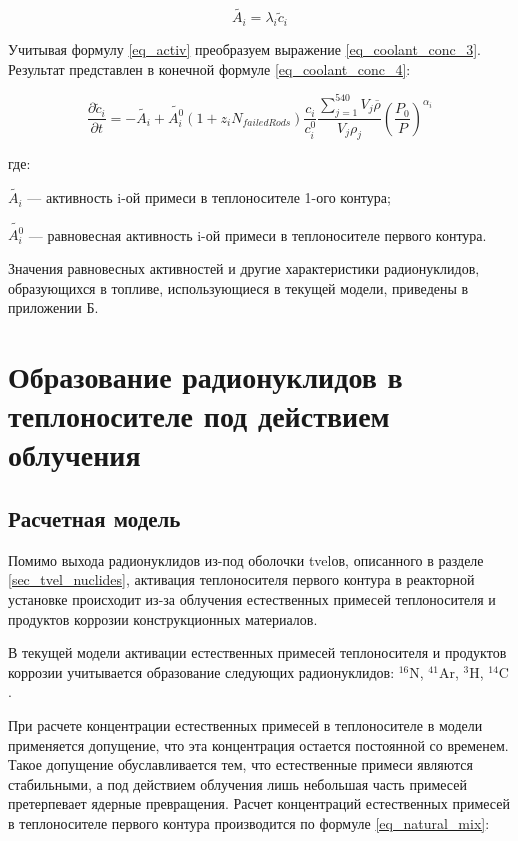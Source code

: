 \begin{equation}
    \label{eq_activ}
    \widetilde{A_{i}} = \lambda_{i} \widetilde{c}_{i}
\end{equation}

Учитывая формулу \ref{eq_activ} преобразуем выражение \ref{eq_coolant_conc_3}. Результат представлен в конечной формуле 
\ref{eq_coolant_conc_4}:

\begin{equation}
    \label{eq_coolant_conc_4}
    \frac{\partial \widetilde{c}_{i}}{\partial t} = -\widetilde{A_{i}} + \widetilde{A_{i}^{0}}
        (1 + z_{i}N_{failedRods})\frac{c_{i}}{c_{i}^{0}}\frac{\sum_{j=1}^{540} V_{j}\overline{\rho}}{V_{j}\rho_{j}}
        (\frac{P_{0}}{P})^{\alpha_{i}}
\end{equation}

где:
\begin{description}
    \item $\widetilde{A_{i}}$ --- активность i-ой примеси в теплоносителе 1-ого контура;
    \item $\widetilde{A_{i}^{0}}$ --- равновесная активность i-ой примеси в теплоносителе первого контура.
\end{description}

Значения равновесных активностей и другие характеристики радионуклидов, образующихся в топливе, использующиеся в 
текущей модели, приведены в приложении Б.

\section{Образование радионуклидов в теплоносителе под действием облучения}

\subsection{Расчетная модель}

Помимо выхода радионуклидов из-под оболочки \ac{tvel}ов, описанного в разделе \ref{sec_tvel_nuclides}, активация 
теплоносителя первого контура в реакторной установке происходит из-за облучения естественных примесей теплоносителя и 
продуктов коррозии конструкционных материалов. 

В текущей модели активации естественных примесей теплоносителя и продуктов коррозии учитывается образование следующих 
радионуклидов: $^{16}\text{N}$, $^{41}\text{Ar}$, $^{3}\text{H}$, $^{14}\text{C}$.

При расчете концентрации естественных примесей в теплоносителе в модели применяется допущение, что эта концентрация 
остается постоянной со временем. Такое допущение обуславливается тем, что естественные примеси являются стабильными, а 
под действием облучения лишь небольшая часть примесей претерпевает ядерные превращения. Расчет концентраций естественных 
примесей в теплоносителе первого контура производится по формуле \ref{eq_natural_mix}:

